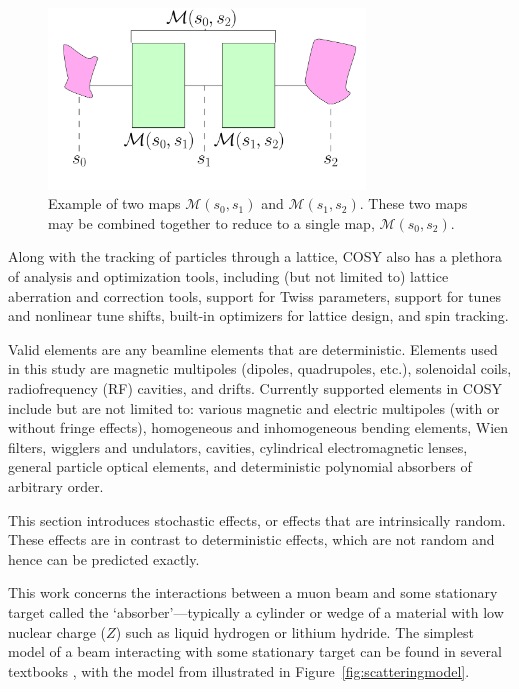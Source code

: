 \begin{figure}[h!]
  \centering
    \includegraphics[width=0.75\textwidth]{Figures/matrix_element_example_2} 
  \caption{Example of two maps $\mathcal{M}(s_0,s_1)$ and $\mathcal{M}(s_1,s_2)$. These two maps may be combined together to reduce to a single map, $\mathcal{M}(s_0,s_2)$.}
  \label{fig:matrix_element_example_2}
\end{figure}

Along with the tracking of particles through a lattice, COSY also has a plethora of analysis and optimization tools, including (but not limited to) lattice aberration and correction tools, support for Twiss parameters, support for tunes and nonlinear tune shifts, built-in optimizers for lattice design, and spin tracking.

Valid elements are any beamline elements that are deterministic. Elements used in this study are magnetic multipoles (dipoles, quadrupoles, etc.), solenoidal coils, radiofrequency (RF) cavities, and drifts. Currently supported elements in COSY include but are not limited to: various magnetic and electric multipoles (with or without fringe effects), homogeneous and inhomogeneous bending elements, Wien filters, wigglers and undulators, cavities, cylindrical electromagnetic lenses, general particle optical elements, and deterministic polynomial absorbers of arbitrary order.

\par

This section introduces stochastic effects, or effects that are intrinsically random. These effects are in contrast to deterministic effects, which are not random and hence can be predicted exactly. 

This work concerns the interactions between a muon beam and some stationary target called the `absorber'---typically a cylinder or wedge of a material with low nuclear charge ($Z$) such as liquid hydrogen or lithium hydride. The simplest model of a beam interacting with some stationary target can be found in several textbooks \cite{nielsen,griffithsqm}, with the model from \cite{jose} illustrated in Figure~\ref{fig:scatteringmodel}.

